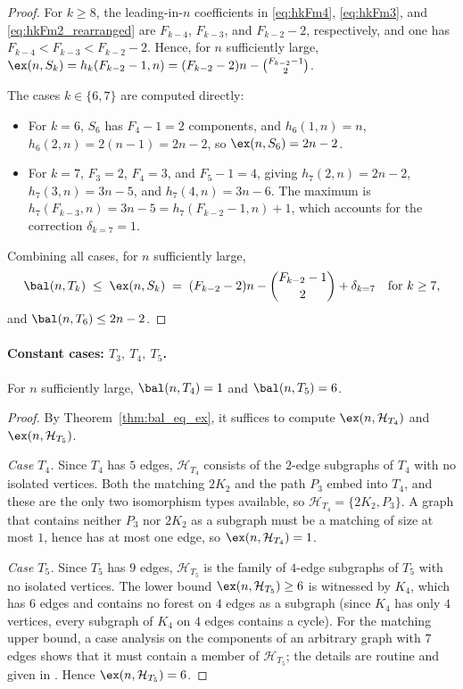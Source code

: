 \begin{proof}
    For $k\geq 8$, the leading-in-$n$ coefficients in \eqref{eq:hkFm4}, \eqref{eq:hkFm3}, and \eqref{eq:hkFm2_rearranged} are $F_{k-4}$, $F_{k-3}$, and $F_{k-2}-2$, respectively, and one has $F_{k-4}<F_{k-3}<F_{k-2}-2$.
    Hence, for $n$ sufficiently large, $\ex(n,S_k)=h_k(F_{k-2}-1,n)=(F_{k-2}-2)n-\binom{F_{k-2}-1}{2}$.

    The cases $k\in\{6,7\}$ are computed directly:
    \begin{itemize}
        \item For $k=6$, $S_6$ has $F_4-1=2$ components, and $h_6(1,n)=n$, $h_6(2,n)=2(n-1)=2n-2$, so $\ex(n,S_6)=2n-2$.
        \item For $k=7$, $F_3=2$, $F_4=3$, and $F_5-1=4$, giving $h_7(2,n)=2n-2$, $h_7(3,n)=3n-5$, and $h_7(4,n)=3n-6$.
        The maximum is $h_7(F_{k-3},n)=3n-5=h_7(F_{k-2}-1,n)+1$, which accounts for the correction $\delta_{k=7}=1$.
    \end{itemize}
    Combining all cases, for $n$ sufficiently large,
    $$
        \bal(n,T_k)\;\leq\;\ex(n,S_k)\;=\;(F_{k-2}-2)n-\binom{F_{k-2}-1}{2}+\delta_{k=7}\quad\text{for }k\geq 7,
    $$
    and $\bal(n,T_6)\leq 2n-2$.
\end{proof}

\paragraph{Constant cases: $T_3,\ T_4,\ T_5$.}

\begin{lemma}\label{lemma:bal_Tk_small}
    For $n$ sufficiently large, $\bal(n,T_4)=1$ and $\bal(n,T_5)=6$.
\end{lemma}

\begin{proof}
    By Theorem~\ref{thm:bal_eq_ex}, it suffices to compute $\ex(n,\mathcal H_{T_4})$ and $\ex(n,\mathcal H_{T_5})$.

    \emph{Case $T_4$.}
    Since $T_4$ has $5$ edges, $\mathcal H_{T_4}$ consists of the $2$-edge subgraphs of $T_4$ with no isolated vertices.
    Both the matching $2K_2$ and the path $P_3$ embed into $T_4$, and these are the only two isomorphism types available, so $\mathcal H_{T_4}=\{2K_2,P_3\}$.
    A graph that contains neither $P_3$ nor $2K_2$ as a subgraph must be a matching of size at most $1$, hence has at most one edge, so $\ex(n,\mathcal H_{T_4})=1$.

    \emph{Case $T_5$.}
    Since $T_5$ has $9$ edges, $\mathcal H_{T_5}$ is the family of $4$-edge subgraphs of $T_5$ with no isolated vertices.
    The lower bound $\ex(n,\mathcal H_{T_5})\geq 6$ is witnessed by $K_4$, which has $6$ edges and contains no forest on $4$ edges as a subgraph (since $K_4$ has only $4$ vertices, every subgraph of $K_4$ on $4$ edges contains a cycle).
    For the matching upper bound, a case analysis on the components of an arbitrary graph with $7$ edges shows that it must contain a member of $\mathcal H_{T_5}$; the details are routine and given in \cite[Lemma~24]{Eslavaetal2025}.
    Hence $\ex(n,\mathcal H_{T_5})=6$.
\end{proof}

